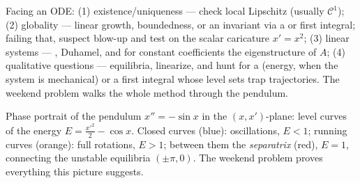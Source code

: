 \begin{method}\label{met:b3:ode:strategy}
Facing an ODE: (1) existence/uniqueness --- check local
Lipschitz (usually $\mathcal C^1$); (2) globality --- linear
growth, boundedness, or an invariant  via a  or first integral; failing that, suspect blow-up
and test on the scalar caricature $x' = x^2$; (3) linear
systems --- , Duhamel, and for constant
coefficients the eigenstructure of $A$; (4) qualitative
questions --- equilibria, linearize, and hunt for a  (energy, when the system is mechanical) or a first
integral whose level sets trap trajectories. The weekend
problem walks the whole method through the pendulum.
\end{method}

\begin{omfigure}

{\small Phase portrait of the pendulum $x'' = -\sin x$ in the
$(x, x')$-plane: level curves of the energy $E = \frac{x'^2}2
- \cos x$. Closed curves (blue): oscillations, $E < 1$;
running curves (orange): full rotations, $E > 1$; between
them the \emph{separatrix} (red), $E = 1$, connecting the
unstable equilibria $(\pm\pi, 0)$. The weekend problem proves
everything this picture suggests.}
\end{omfigure}

